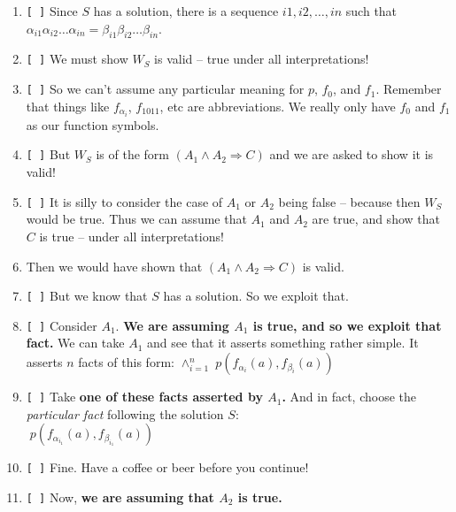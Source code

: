 \documentclass[11pt]{article}
\begin{document}
\begin{Large}
\begin{enumerate}
\item \verb|[ ]|   
  Since $S$ has a solution, there is a sequence
  ${i1}, {i2}, \ldots, {in}$ such that \\
  $\alpha_{i1} \alpha_{i2} \ldots \alpha_{in} =
   \beta_{i1} \beta_{i2} \ldots \beta_{in}$.


 \item \verb|[ ]| We must show $W_S$ is valid -- true under
   all interpretations!

 \item \verb|[ ]|   
   So we can't assume any particular meaning
   for $p$, $f_0$, and $f_1$. Remember that things like 
   $f_{\alpha_i}$, $f_{1011}$, etc are abbreviations. We really
   only have $f_0$ and $f_1$ as our function symbols.

 \item \verb|[ ]|   But $W_S$ is of the form
   $(A_1 \wedge A_2 \Rightarrow C)$ and we are asked to show
   it is valid!

 \item \verb|[ ]| It is silly to consider the case
   of $A_1$ or $A_2$ being false -- because then $W_S$ would
   be true. Thus we can assume that $A_1$ and $A_2$ are true,
   and show that $C$ is true -- under all interpretations!

\item    Then we would have shown that
   $(A_1 \wedge A_2 \Rightarrow C)$ is valid.

\item \verb|[ ]| But we know that $S$ has a solution. So we exploit that.

\item \verb|[ ]|  
  Consider
  $A_1$. {\bf We are  assuming $A_1$ is true, and so we exploit that fact.}
  We can take $A_1$ and see that it asserts something
     rather simple. It asserts $n$ facts of this form:
   $ 
\textstyle \wedge_{i=1}^{n} \; p(f_{\alpha_i}(a), f_{\beta_i}(a)) \;\;\;\;\;\;\;\;  $      

\item \verb|[ ]| \label{step-x}
  Take {\bf one of these facts asserted by $A_1$.}
  And in fact,
  choose the {\em particular fact} following the solution $S$: \\
   $ 
\textstyle \; p(f_{\alpha_{i_1}}(a), f_{\beta_{i_1}}(a)) \;\;\;\;\;\;\;\;  $      
  

 \item \verb|[ ]| Fine. Have a coffee or beer before you continue!

 \item \verb|[ ]| Now, {\bf we are assuming that $A_2$ is true.}
   

\end{enumerate}
\end{Large}
\end{document}
